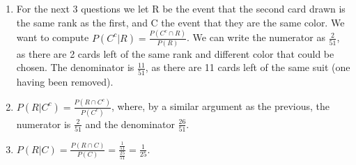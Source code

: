 \documentclass{article}
\begin{document}
\begin{prob}
	\begin{enumerate}
		\item For the next 3 questions we let R be the event that the second card drawn is the same rank as the first, and C the event that they are the same color.
		We want to compute $P(C^c|R)=\frac{P(C^c \cap R)}{P(R)}$. We can write the numerator as $\frac{2}{51}$, as there are 2 cards left of the same rank and different color that could be chosen.
		The denominator is  $\frac{11}{51}$, as there are 11 cards left of the same suit (one having been removed).

	\item $P(R|C^c)=\frac{P(R \cap C^c)}{P(C^c)}$, where, by a similar argument as the previous, the numerator is $\frac{2}{51}$ and the denominator $\frac{26}{51}$.

	\item $P(R|C)=\frac{P(R \cap C)}{P(C)}=\frac{\frac{1}{51}}{\frac{25}{51}} =\frac{1}{25}$.
	\end{enumerate}
\end{prob}
\begin{prob}
	
\end{prob}
\end{document}
